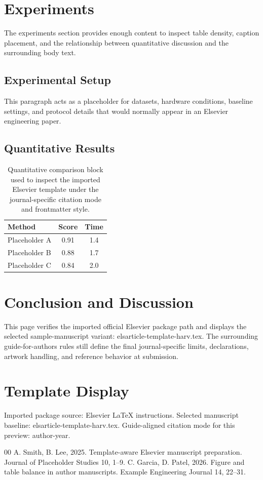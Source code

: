 \documentclass[preprint,12pt,authoryear]{elsarticle}
\begin{document}
\section{Experiments}
The experiments section provides enough content to inspect table density, caption placement, and the relationship between quantitative discussion and the surrounding body text.
\subsection{Experimental Setup}
This paragraph acts as a placeholder for datasets, hardware conditions, baseline settings, and protocol details that would normally appear in an Elsevier engineering paper.
\subsection{Quantitative Results}
\begin{table}[t]
\centering
\caption{Quantitative comparison block used to inspect the imported Elsevier template under the journal-specific citation mode and frontmatter style.}
\begin{tabular}{lcc}
\toprule
Method & Score & Time \\
\midrule
Placeholder A & 0.91 & 1.4 \\
Placeholder B & 0.88 & 1.7 \\
Placeholder C & 0.84 & 2.0 \\
\bottomrule
\end{tabular}
\end{table}
\section{Conclusion and Discussion}
This page verifies the imported official Elsevier package path and displays the selected sample-manuscript variant: elsarticle-template-harv.tex. The surrounding guide-for-authors rules still define the final journal-specific limits, declarations, artwork handling, and reference behavior at submission.
\section*{Template Display}
Imported package source: Elsevier LaTeX instructions. Selected manuscript baseline: elsarticle-template-harv.tex. Guide-aligned citation mode for this preview: author-year.
\begin{thebibliography}{00}
 A. Smith, B. Lee, 2025. Template-aware Elsevier manuscript preparation. Journal of Placeholder Studies 10, 1--9.
 C. Garcia, D. Patel, 2026. Figure and table balance in author manuscripts. Example Engineering Journal 14, 22--31.
\end{thebibliography}
\end{document}
